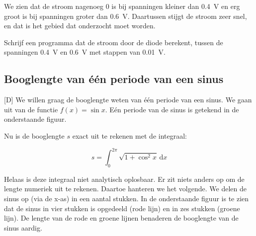 \documentclass[a4paper,10pt,fleqn,twoside]{article}
\begin{document}
We zien dat de stroom nagenoeg 0 is bij spanningen kleiner dan \SI{0.4}{\volt} en erg groot is bij spanningen groter dan \SI{0.6}{\volt}. Daartussen stijgt de stroom zeer snel, en dat is het gebied dat onderzocht moet worden.

Schrijf een programma dat de stroom door de diode berekent, tussen de spanningen \SI{0.4}{\volt} en \SI{0.6}{\volt} met stappen van \SI{0.01}{\volt}.

\subsection{Booglengte van één periode van een sinus}[D]
We willen graag de booglengte weten van één periode van een sinus. We gaan uit van de functie $f(x) = \sin x$. Eén periode van de sinus is getekend in de onderstaande figuur.

\begin{figure}[H]
\centering
{}%
\end{figure}

Nu is de booglengte $s$ exact uit te rekenen met de integraal:

\begin{equation*}
s = \int_0^{2\pi} \sqrt{1+\cos^2 x}\, \mathrm{d}x
\end{equation*}

Helaas is deze integraal niet analytisch oplosbaar. Er zit niets anders op om de lengte numeriek uit te rekenen. Daartoe hanteren we het volgende. We delen de sinus op (via de x-as) in een aantal stukken. In de onderstaande figuur is te zien dat de sinus in vier stukken is opgedeeld (rode lijn) en in zes stukken (groene lijn). De lengte van de rode en groene lijnen benaderen de booglengte van de sinus aardig.

\begin{figure}[H]
\centering
{}%
\end{figure}
\end{document}
